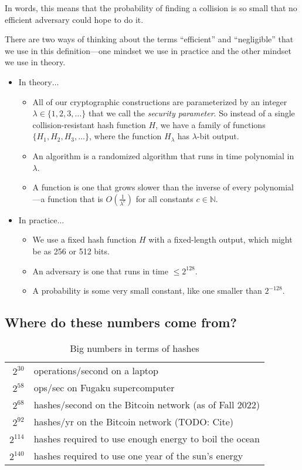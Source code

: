 In words, this means that the probability of finding a collision is so small that no efficient adversary could hope to do it.

There are two ways of thinking about the terms ``efficient'' and ``negligible'' that 
we use in this definition---one mindset we use in practice and the other mindset we use in theory.

\begin{itemize}
	\item In theory$\ldots$
		\begin{itemize}
      \item All of our cryptographic constructions are parameterized by an integer $\lambda \in \{1, 2, 3, \dots\}$
            that we call the \textit{security parameter}.
            So instead of a single collision-resistant hash function $H$, we have a family of functions
            $\{ H_1, H_2, H_3, \dots \}$, where the function $H_\lambda$ has $\lambda$-bit output. 
			\item An  algorithm is a randomized algorithm that runs in time polynomial in $\lambda$.
			\item A  function is one that grows slower than the inverse of every polynomial---a function that is $O(\frac{1}{\lambda^c})$
            for all constants $c \in \mathbb{N}$.  
		\end{itemize}
	\item In practice$\ldots$
		\begin{itemize}
			\item We use a fixed hash function $H$ with a fixed-length output,
        which might be as 256 or 512 bits.
			\item An  adversary is one that runs in time $\leq 2^{128}$.
			\item A  probability is some very small constant, like one smaller than $2^{-128}$.
		\end{itemize}
\end{itemize}

\subsection{Where do these numbers come from?}

\begin{table}[htpb]
	\centering
	\caption{Big numbers in terms of hashes}
	\label{tab:exp-work}

	\begin{tabular}{rl}
		$2^{30}$ & operations/second on a laptop \\
		$2^{58}$ & ops/sec on Fugaku supercomputer \\
		$2^{68}$ & hashes/second on the Bitcoin network (as of Fall 2022) \\
    $2^{92}$ & hashes/yr on the Bitcoin network (TODO: Cite)\\
		$2^{114}$ & hashes required to use enough energy to boil the ocean \\
		$2^{140}$ & hashes required to use one year of the sun's energy \\
	\end{tabular}
\end{table}

